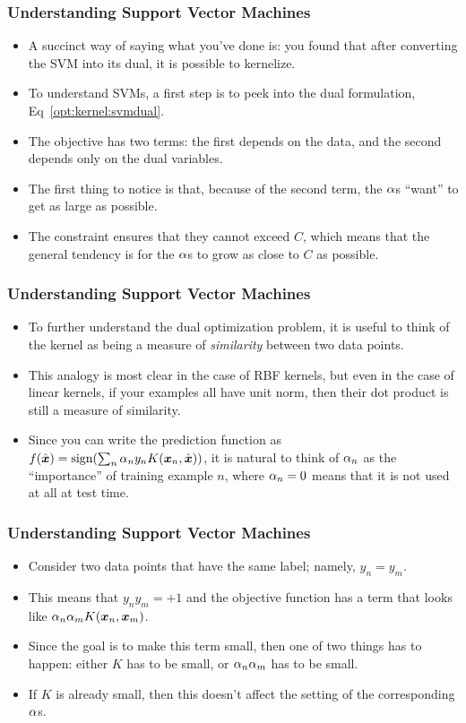 \documentclass[trans]{beamer}
\begin{document}
\begin{frame}
  \frametitle{Understanding Support Vector Machines}
\begin{itemize}
\item 
A succinct way of saying what you've done is: you found that after
converting the SVM into its dual, it is possible to kernelize.
\item
To understand SVMs, a first step is to peek into the dual formulation,
Eq~\eqref{opt:kernel:svmdual}.
\item  The objective has two terms: the first
depends on the data, and the second depends only on the dual
variables.
\item  The first thing to notice is that, because of the second
term, the $\alpha$s ``want'' to get as large as possible.  
\item The constraint
ensures that they cannot exceed $C$, which means that the general
tendency is for the $\alpha$s to grow as close to $C$ as possible.
\end{itemize}
\end{frame}

\begin{frame}
  \frametitle{Understanding Support Vector Machines}
\begin{itemize}
\item 
To further understand the dual optimization problem, it is useful to
think of the kernel as being a measure of \emph{similarity} between
two data points.
\item  This analogy is most clear in the case of RBF
kernels, but even in the case of linear kernels, if your examples all
have unit norm, then their dot product is still a measure of
similarity.
\item  Since you can write the prediction function as $f(\hat {{\boldsymbol{x}}})
= \textrm{sign}( \sum_n \alpha_n y_n K({\boldsymbol{x}}_n,\hat {{\boldsymbol{x}}}) )$, it is natural to think
of $\alpha_n$ as the ``importance'' of training example $n$, where $\alpha_n
= 0$ means that it is not used at all at test time.
\end{itemize}
\end{frame}

\begin{frame}
  \frametitle{Understanding Support Vector Machines}
\begin{itemize}
\item 
Consider two data points that have the same label; namely, $y_n =
y_m$.  
\item This means that $y_n y_m = +1$ and the objective function has a
term that looks like $\alpha_n \alpha_m K({\boldsymbol{x}}_n, {\boldsymbol{x}}_m)$.  
\item Since the goal is to
make this term small, then one of two things has to happen: either $K$
has to be small, or $\alpha_n \alpha_m$ has to be small.
\item  If $K$ is already
small, then this doesn't affect the setting of the corresponding
$\alpha$s.
\end{itemize}
\end{frame}
\end{document}
